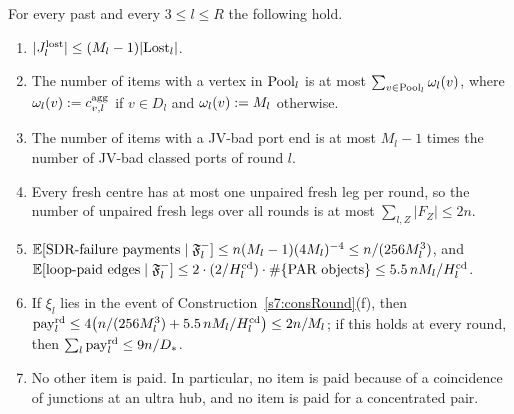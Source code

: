 \begin{lemma}[Payments]\label{s7:lemPay}
For every past and every $3\le l\le R$ the following hold.
\begin{enumerate}
\item[(a1)] $|J^{\mathrm{lost}}_l|\le(M_l-1)|\mathrm{Lost}_l|$.
\item[(a2)] The number of items with a vertex in $\mathrm{Pool}_l$ is at most
$\sum_{v\in\mathrm{Pool}_l}\omega_l(v)$, where $\omega_l(v)\mathrel{:=}c^{\mathrm{agg}}_{v,l}$ if
$v\in D_l$ and $\omega_l(v)\mathrel{:=} M_l$ otherwise.
\item[(a3)] The number of items with a JV-bad port end is at most $M_l-1$ times
the number of JV-bad classed ports of round $l$.
\item[(b)] Every fresh centre has at most one unpaired fresh leg per round, so
the number of unpaired fresh legs over all rounds is at most
$\sum_{l,Z}|F_Z|\le2n$.
\item[(c)] $\mathbb{E}[\text{SDR-failure payments}\mid\mathfrak{F}^{-}_l]\le n(M_l-1)(4M_l)^{-4}\le n/(256M_l^3)$,
and $\mathbb{E}[\text{loop-paid edges}\mid\mathfrak{F}^{-}_l]\le2\cdot(2/H^{\mathrm{cd}}_l)\cdot\#\{\text{PAR objects}\}\le5.5\,nM_l/H^{\mathrm{cd}}_l$.
\item[(d)] If $\xi_l$ lies in the event of Construction~\ref{s7:consRound}(f),
then $\mathrm{pay}^{\mathrm{rd}}_l\le4\bigl(n/(256M_l^3)+5.5\,nM_l/H^{\mathrm{cd}}_l\bigr)\le2n/M_l$; if this
holds at every round, then $\sum_l\mathrm{pay}^{\mathrm{rd}}_l\le9n/D_{*}$.
\item[(e)] No other item is paid. In particular, no item is paid because of a
coincidence of junctions at an ultra hub, and no item is paid for a concentrated
pair.
\end{enumerate}
\deps{\ref{s7:consRound}, \ref{s7:lemWellDef}, \ref{s6:lemJplus}, \ref{s2:propParentless}, \ref{s2:lemTower}}
\end{lemma}

